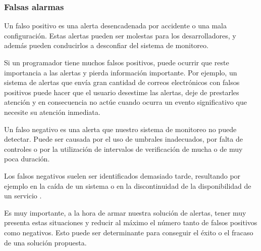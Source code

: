 \subsubsection*{Falsas alarmas}
\label{falsas_alarmas}

Un falso positivo es una alerta desencadenada por accidente o una mala
configuración. Estas alertas pueden ser molestas para los desarrolladores, y
además pueden conducirlos a desconfiar del sistema de monitoreo.

Si un programador tiene muchos falsos positivos, puede ocurrir que reste
importancia a las alertas y pierda información importante. Por ejemplo, un
sistema de alertas que envía gran cantidad de correos electrónicos con falsos
positivos puede hacer que el usuario desestime las alertas, deje de prestarles
atención y en consecuencia no actúe cuando ocurra un evento significativo que
necesite su atención inmediata.

Un falso negativo es una alerta que nuestro sistema de monitoreo no puede
detectar. Puede ser causada por el uso de umbrales inadecuados, por falta de
controles o por la utilización de intervalos de verificación de mucha o de muy
poca duración.

Los falsos negativos suelen ser identificados demasiado tarde, resultando por
ejemplo en la caída de un sistema o en la discontinuidad de la disponibilidad
de un servicio \cite[p.~16]{monitoreo:monitoring_with_grapfite}.

Es muy importante, a la hora de armar nuestra solución de alertas, tener muy
presenta estas situaciones y reducir al máximo el número tanto de falsos
positivos como negativos. Esto puede ser determinante para conseguir el éxito o
el fracaso de una solución propuesta.
